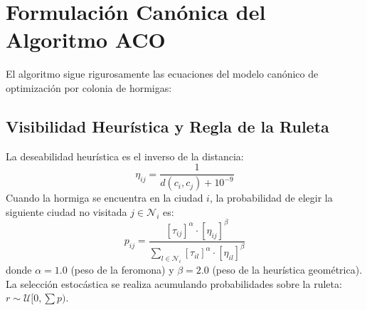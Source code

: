 \documentclass[11pt,a4paper]{article}
\begin{document}
\section{Formulación Canónica del Algoritmo ACO}

El algoritmo sigue rigurosamente las ecuaciones del modelo canónico de optimización por colonia de hormigas:

\subsection{Visibilidad Heurística y Regla de la Ruleta}
La deseabilidad heurística es el inverso de la distancia:
\begin{equation}
    \eta_{ij} = \frac{1}{d(c_i, c_j) + 10^{-9}}
\end{equation}
Cuando la hormiga se encuentra en la ciudad $i$, la probabilidad de elegir la siguiente ciudad no visitada $j \in \mathcal{N}_i$ es:
\begin{equation}
    p_{ij} = \frac{\left[\tau_{ij}\right]^\alpha \cdot \left[\eta_{ij}\right]^\beta}{\sum_{l \in \mathcal{N}_i} \left[\tau_{il}\right]^\alpha \cdot \left[\eta_{il}\right]^\beta}
\end{equation}
donde $\alpha = 1.0$ (peso de la feromona) y $\beta = 2.0$ (peso de la heurística geométrica). La selección estocástica se realiza acumulando probabilidades sobre la ruleta: $r \sim \mathcal{U}[0, \sum p)$.
\end{document}
